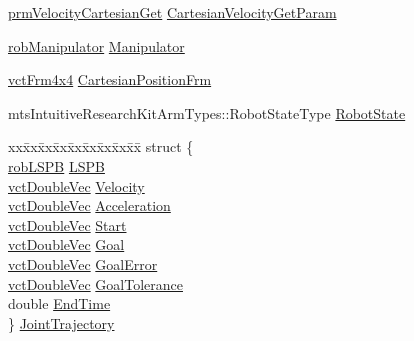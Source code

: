 \begin{DoxyCompactItemize}
\hyperlink{classprm_velocity_cartesian_get}{prm\+Velocity\+Cartesian\+Get} \hyperlink{classmts_intuitive_research_kit_arm_a1b90c6afd8759c41e232547e12586509}{Cartesian\+Velocity\+Get\+Param}
\item 
\hyperlink{classrob_manipulator}{rob\+Manipulator} \hyperlink{classmts_intuitive_research_kit_arm_a23c8e64cf6cf630a5410cf433995c403}{Manipulator}
\item 
\hyperlink{vct_transformation_types_8h_a33da47f4deb2556b37a69a2c44b29d75}{vct\+Frm4x4} \hyperlink{classmts_intuitive_research_kit_arm_ae5daa9b91ff92c29f280815c118e6520}{Cartesian\+Position\+Frm}
\item 
mts\+Intuitive\+Research\+Kit\+Arm\+Types\+::\+Robot\+State\+Type \hyperlink{classmts_intuitive_research_kit_arm_a228b8565cffee0c6d9b1c756d0f0deec}{Robot\+State}
\item 
\begin{tabbing}
xx\=xx\=xx\=xx\=xx\=xx\=xx\=xx\=xx\=\kill
struct \{\\
\>\hyperlink{classrob_l_s_p_b}{robLSPB} \hyperlink{classmts_intuitive_research_kit_arm_a9643169688f8e9ab2a85bead9d5c9300}{LSPB}\\
\>\hyperlink{vct_dynamic_vector_types_8h_ade4b3068c86fb88f41af2e5187e491c2}{vctDoubleVec} \hyperlink{classmts_intuitive_research_kit_arm_a54046b45c03a94fcacb9a3b335a19c0a}{Velocity}\\
\>\hyperlink{vct_dynamic_vector_types_8h_ade4b3068c86fb88f41af2e5187e491c2}{vctDoubleVec} \hyperlink{classmts_intuitive_research_kit_arm_aeab53c900044d1cf53107b06a2216c7d}{Acceleration}\\
\>\hyperlink{vct_dynamic_vector_types_8h_ade4b3068c86fb88f41af2e5187e491c2}{vctDoubleVec} \hyperlink{classmts_intuitive_research_kit_arm_a94cbc8bebf4566ca94cb03cc007186f7}{Start}\\
\>\hyperlink{vct_dynamic_vector_types_8h_ade4b3068c86fb88f41af2e5187e491c2}{vctDoubleVec} \hyperlink{classmts_intuitive_research_kit_arm_ab8b3ea821aed3be80e1a809bb684a255}{Goal}\\
\>\hyperlink{vct_dynamic_vector_types_8h_ade4b3068c86fb88f41af2e5187e491c2}{vctDoubleVec} \hyperlink{classmts_intuitive_research_kit_arm_a74155dcbfb69272c3babae70ae0edb38}{GoalError}\\
\>\hyperlink{vct_dynamic_vector_types_8h_ade4b3068c86fb88f41af2e5187e491c2}{vctDoubleVec} \hyperlink{classmts_intuitive_research_kit_arm_a3ffd256e671710371a02aeb18e532c9d}{GoalTolerance}\\
\>double \hyperlink{classmts_intuitive_research_kit_arm_a3481873c8bd31844a5fa40cf30fb738f}{EndTime}\\
\} \hyperlink{classmts_intuitive_research_kit_arm_a4fed4b32e2391d05746e7fde43eda5a1}{JointTrajectory}\\


\end{tabbing}
\end{DoxyCompactItemize}

